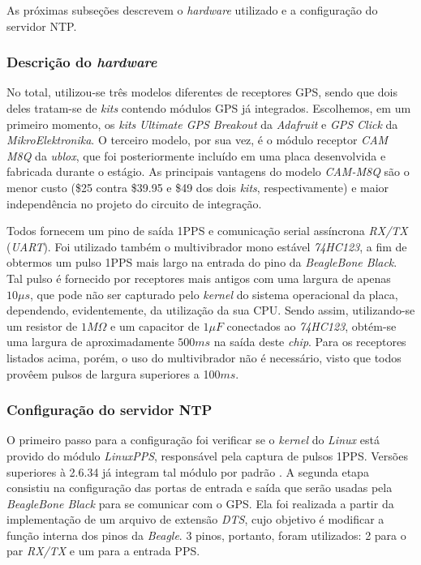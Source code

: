 \vspace{12pt}

As próximas subseções descrevem o \textit{hardware} utilizado e a
configuração do servidor NTP.

\subsubsection{Descrição do \textit{hardware}}

No total, utilizou-se três modelos diferentes de receptores GPS, sendo que dois
deles tratam-se de \textit{kits} contendo módulos GPS já integrados. Escolhemos,
em um primeiro momento, os \textit{kits} \textit{Ultimate GPS Breakout} da
\textit{Adafruit} e \textit{GPS Click} da \textit{MikroElektronika}. O terceiro
modelo, por sua vez, é o módulo receptor \textit{CAM M8Q} da \textit{ublox}, que
foi posteriormente incluído em uma placa desenvolvida e fabricada durante o
estágio. As principais vantagens do modelo \textit{CAM-M8Q} são o menor custo
(\$25 contra \$39.95 e \$49 dos dois \textit{kits}, respectivamente) e maior
independência no projeto do circuito de integração.

\vspace{12pt}

Todos fornecem um pino de saída 1PPS e comunicação serial assíncrona
\textit{RX/TX} (\textit{UART}). Foi utilizado também o multivibrador mono
estável \textit{74HC123}, a fim de obtermos um pulso 1PPS mais largo na entrada
do pino da \textit{BeagleBone Black}. Tal pulso é fornecido por receptores mais
antigos com uma largura de apenas \(10\mu s\), que pode não ser capturado pelo
\textit{kernel} do sistema operacional da placa, dependendo, evidentemente, da
utilização da sua CPU. Sendo assim, utilizando-se um resistor de \(1M\Omega\) e
um capacitor de \(1\mu F\) conectados ao \textit{74HC123}, obtém-se uma largura
de aproximadamente \(500 ms\) na saída deste \textit{chip}. Para os receptores
listados acima, porém, o uso do multivibrador não é necessário, visto que todos provêem pulsos de largura superiores a 100\(ms\).

\subsubsection{Configuração do servidor NTP}

O primeiro passo para a configuração foi verificar se o \textit{kernel} do
\textit{Linux} está provido do módulo \textit{LinuxPPS}, responsável pela
captura de pulsos 1PPS. Versões superiores à 2.6.34 já integram tal módulo por
padrão \cite{linuxpps}. A segunda etapa consistiu na configuração das portas de
entrada e saída que serão usadas pela \textit{BeagleBone Black} para se comunicar com o
GPS. Ela foi realizada a partir da implementação de um arquivo de extensão
\textit{DTS}, cujo objetivo é modificar a função interna dos pinos da
\textit{Beagle}. 3 pinos, portanto, foram utilizados: 2 para o par
\textit{RX/TX} e um para a entrada PPS. 

